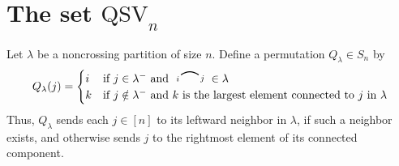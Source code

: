 \documentclass[submission]{FPSAC2024}
\newtheorem{lem}[equation]{Lemma}
\theoremstyle{definition}
\theoremstyle{remark}
\numberwithin{equation}{section}
\renewcommand{\setminus}{-}
\newcommand{\QSV}{\mathrm{QSV}}
\newcommand{\edge}[2]{\tikz[scale = 0.75, baseline = -0.2cm]{
\draw (0.1, 0) node[inner sep = 0ex] (a) {};
\node[left, xshift = 0.1cm, yshift = -0.1cm] at (a) {$\scriptstyle #1$};
\draw (0.9, 0)  node[inner sep = 0ex] (b) {};
\node[right, xshift = -0.1cm, yshift = -0.1cm] at (b) {$\scriptstyle #2$};
\draw[thick] (a) to[out = 35, in = 145] (b);}}
\begin{document}
\section{The set $\QSV_{n}$}
\label{sec:QSV}


Let $\lambda$ be a noncrossing partition of size $n$.
Define a permutation $Q_{\lambda} \in S_{n}$ by 
\[
Q_{\lambda}(j) = \begin{cases} i & \text{if $j \in \lambda^{-}$ and $ \edge{i}{j} \in \lambda$} \\
k & \text{if $j \notin \lambda^{-}$ and $k$ is the largest element connected to $j$ in $\lambda$}
\end{cases}
\]
Thus, $Q_{\lambda}$ sends each $j \in [n]$ to its leftward neighbor in $\lambda$, if such a neighbor exists, and otherwise sends $j$ to the rightmost element of its connected component.  

%
\end{document}
